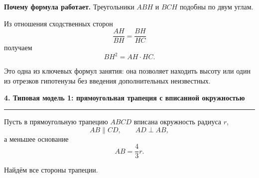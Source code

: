 \documentclass[a4paper,12pt]{article}
\newcommand{\Section}[1]{%
    \vspace{0.4em}%
    {\Large\bfseries\color{darkaccent}#1}\par
    \vspace{0.25em}
    \noindent
    \textcolor{linegray}{\rule{\linewidth}{0.6pt}}
    \vspace{0.5em}%
}
\begin{document}
\begin{center}


\end{center}

\textbf{Почему формула работает.}
Треугольники $ABH$ и $BCH$ подобны по двум углам.

Из отношения сходственных сторон
\[
\frac{AH}{BH}
=
\frac{BH}{HC}
\]
получаем
\[
BH^2=AH\cdot HC.
\]

Это одна из ключевых формул занятия:
она позволяет находить высоту
или один из отрезков гипотенузы
без введения дополнительных неизвестных.

\Section{4. Типовая модель 1: прямоугольная трапеция с вписанной окружностью}

Пусть в прямоугольную трапецию $ABCD$
вписана окружность радиуса $r$,
\[
AB\parallel CD,
\qquad
AD\perp AB,
\]
а меньшее основание
\[
AB=\frac43r.
\]

Найдём все стороны трапеции.
\end{document}
